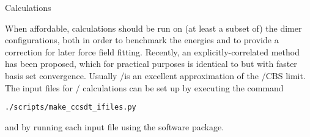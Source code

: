 
\begin{section}{\ccsdt Calculations}
\label{sec:workflow-ccsdt}

When affordable, \ccsdt calculations should be run on (at least a subset of) the
dimer configurations, both in order to benchmark the \dftsapt energies and to
provide a \dccsdt correction for later force field fitting.
Recently, an explicitly-correlated \ccsdtf method has been proposed, which for
practical purposes is identical to \ccsdt but with faster basis set
convergence.\cite{Knizia2009}
Usually /\avtzm is an excellent
approximation of the \ccsdt/CBS limit. The input files for \ccsdtf/\avtzm
calculations can be set up by executing the command
%
\begin{lstlisting}
./scripts/make_ccsdt_ifiles.py
\end{lstlisting}
%
and by running each input file using the \molpro software package.


\end{section}
